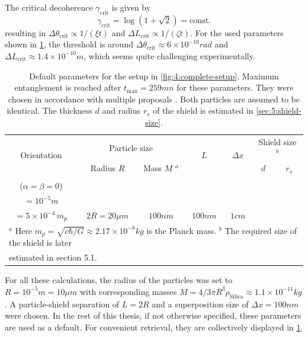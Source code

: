 The critical decoherence $\gamma_\mathrm{crit}$ is given by
\begin{equation}\label{eq:4:critical-point}
  \gamma_\mathrm{crit} = \log(1 + \sqrt{2}) = \mathrm{const.}
\end{equation}
resulting in $\Delta\theta_\mathrm{crit} \propto 1/(\xi t)$ and $\Delta L_\mathrm{crit} \propto 1/(\zeta t)$. 
For the used parameters shown in \cref{tab:paramters}, the threshold is around $\Delta \theta_\mathrm{crit} \approx 6 \times 10^{-10} \si{rad}$ and $\Delta L_\mathrm{crit} \approx 1.4 \times 10^{-10} \si{m}$, which seems quite challenging experimentally.
\begin{table}[!t]
  \centering
  \begin{adjustbox}{max width=\textwidth}
    \begin{tabularx}{\textwidth}{c c c c c c c}
      \toprule
      \multirow{2}{*}{Orientation} & \multicolumn{2}{c}{Particle size} & \multirow{2}{*}{$L$} & \multirow{2}{*}{$\Delta x$} & \multicolumn{2}{c}{Shield size $^b$} \\ \cline{2-3} \cline{6-7}
      & Radius $R$ & Mass $M$ $^a$ & & & $d$ & $r_s$\\
      \midrule
      \begin{tabular}{@{}c@{}}Parallel \\ ($\alpha=\beta=0$) \end{tabular} & \begin{tabular}{@{}c@{}}$10\si{\mu m}$ \\ $=10^{-5}\si{m}$\end{tabular} & \begin{tabular}{@{}c@{}}$\approx 10^{-11}\si{kg}$ \\ $=5\times 10^{-4} \, m_p$\end{tabular} & $2R=20\si{\mu m}$ & $100\si{nm}$ & $100\si{nm}$ & $1\si{cm}$ \\
      \bottomrule
      \multicolumn{7}{l}{\footnotesize $^a$ Here $m_p = \sqrt{c\hbar/G}\approx 2.17\times 10^{-8}\si{kg}$ is the Planck mass. $^b$ The required size of the shield is later} \\[-4pt]
      \multicolumn{7}{l}{\footnotesize estimated in section 5.1.} \\[5pt]
    \end{tabularx}
  \end{adjustbox}
  \caption{Default parameters for the setup in \cref{fig:4:complete-setup}. Maximum entanglement is reached after $t_\mathrm{max} = 259\si{mn}$ for these parameters. They were chosen in accordance with multiple proposals \cite{Aspelmeyer_2024,Rijavec_2021}. Both particles are assumed to be identical. The thickness $d$ and radius $r_s$ of the shield is estimated in \cref{sec:5:shield-size}.}
  \label{tab:paramters}
\end{table}
For all these calculations, the radius of the particles was set to $R=10^{-5}\si{m} = 10\si{\mu m}$ with corresponding masses $M=4/3 \pi R^3 \rho_\mathrm{Silica} \approx 1.1\times 10^{-11}\si{kg}$.
A particle-shield separation of $L=2R$ and a superposition size of $\Delta x = 100\si{nm}$ were chosen. In the rest of this thesis, if not otherwise specified, these parameters are used as a default.
For convenient retrieval, they are collectively displayed in \cref{tab:paramters}.

